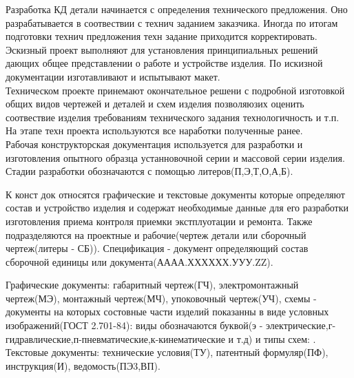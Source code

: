 \documentclass[a4paper, 12pt]{article}
\begin{document}
Разработка КД детали начинается с определения технического предложения. Оно разрабатывается в соотвествии с технич заданием заказчика. Иногда по итогам подготовки технич предложения техн задание приходится корректировать.\\

Эскизный проект выполняют для установления принципиальных решений дающих общее представлении о работе и устройстве изделия. По искизной документации изготавливают и испытывают макет. \\

Техническом проекте принемают окончательное решени с подробной изготовкой общих видов чертежей и деталей и схем изделия позволяюзих оценить соотвествие изделия требованиям технического задания технологичность и т.п. На этапе техн проекта используются все наработки полученные ранее.\\

Рабочая конструкторская документация используется для разработки и изготовления опытного образца устанновочной серии и массовой серии изделия. Стадии разработки обозначаются с помощью литеров(П,Э,Т,О,А,Б).

К конст док относятся графические и текстовые документы которые определяют состав и устройство изделия и содержат необходимые данные для его разработки изготовления приема контроля приемки экстплуотации и ремонта. Также подразделяются на проектные и рабочие(чертеж детали или сборочный чертеж(литеры - СБ)). Спецификация - документ определяющий состав сборочной единицы или документа(АААА.ХХХХХХ.УУУ.ZZ). 

Графические документы: габаритный чертеж(ГЧ), электромонтажный чертеж(МЭ), монтажный чертеж(МЧ), упоковочный чертеж(УЧ), схемы - документы на которых состовные части изделий показанны в виде условных изображений(ГОСТ 2.701-84): виды обозначаются буквой(э - электрические,г-гидравлические,п-пневматические,к-кинематические и т.д) и типы схем: %
.\\

Текстовые документы: технические условия(ТУ), патентный формуляр(ПФ), инструкция(И), ведомость(ПЭ3,ВП).
\end{document}
